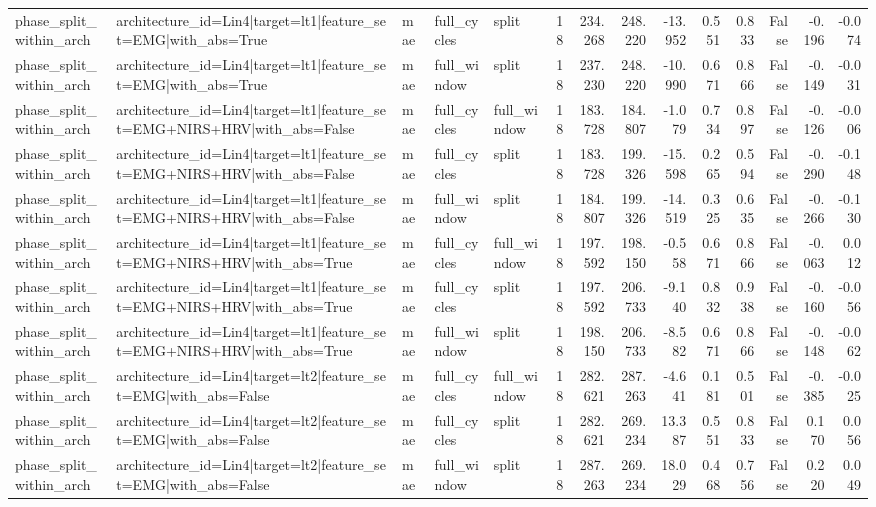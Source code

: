 \begin{table}
\begin{tabular}{lllllrrrrrrrrr}
phase_split_within_arch & architecture_id=Lin4|target=lt1|feature_set=EMG|with_abs=True & mae & full_cycles & split & 18 & 234.268 & 248.220 & -13.952 & 0.551 & 0.833 & False & -0.196 & -0.074 \\
phase_split_within_arch & architecture_id=Lin4|target=lt1|feature_set=EMG|with_abs=True & mae & full_window & split & 18 & 237.230 & 248.220 & -10.990 & 0.671 & 0.866 & False & -0.149 & -0.031 \\
phase_split_within_arch & architecture_id=Lin4|target=lt1|feature_set=EMG+NIRS+HRV|with_abs=False & mae & full_cycles & full_window & 18 & 183.728 & 184.807 & -1.079 & 0.734 & 0.897 & False & -0.126 & -0.006 \\
phase_split_within_arch & architecture_id=Lin4|target=lt1|feature_set=EMG+NIRS+HRV|with_abs=False & mae & full_cycles & split & 18 & 183.728 & 199.326 & -15.598 & 0.265 & 0.594 & False & -0.290 & -0.148 \\
phase_split_within_arch & architecture_id=Lin4|target=lt1|feature_set=EMG+NIRS+HRV|with_abs=False & mae & full_window & split & 18 & 184.807 & 199.326 & -14.519 & 0.325 & 0.635 & False & -0.266 & -0.130 \\
phase_split_within_arch & architecture_id=Lin4|target=lt1|feature_set=EMG+NIRS+HRV|with_abs=True & mae & full_cycles & full_window & 18 & 197.592 & 198.150 & -0.558 & 0.671 & 0.866 & False & -0.063 & 0.012 \\
phase_split_within_arch & architecture_id=Lin4|target=lt1|feature_set=EMG+NIRS+HRV|with_abs=True & mae & full_cycles & split & 18 & 197.592 & 206.733 & -9.140 & 0.832 & 0.938 & False & -0.160 & -0.056 \\
phase_split_within_arch & architecture_id=Lin4|target=lt1|feature_set=EMG+NIRS+HRV|with_abs=True & mae & full_window & split & 18 & 198.150 & 206.733 & -8.582 & 0.671 & 0.866 & False & -0.148 & -0.062 \\
phase_split_within_arch & architecture_id=Lin4|target=lt2|feature_set=EMG|with_abs=False & mae & full_cycles & full_window & 18 & 282.621 & 287.263 & -4.641 & 0.181 & 0.501 & False & -0.385 & -0.025 \\
phase_split_within_arch & architecture_id=Lin4|target=lt2|feature_set=EMG|with_abs=False & mae & full_cycles & split & 18 & 282.621 & 269.234 & 13.387 & 0.551 & 0.833 & False & 0.170 & 0.056 \\
phase_split_within_arch & architecture_id=Lin4|target=lt2|feature_set=EMG|with_abs=False & mae & full_window & split & 18 & 287.263 & 269.234 & 18.029 & 0.468 & 0.756 & False & 0.220 & 0.049 \\

\end{tabular}
\end{table}
